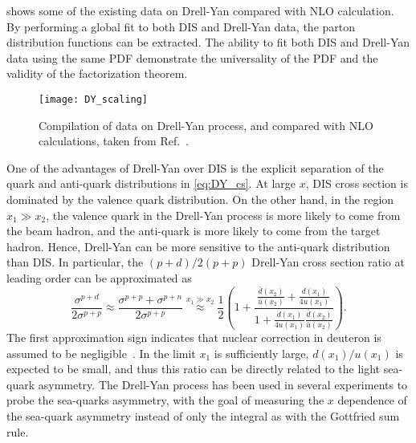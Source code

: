 \documentclass[../main.tex]{subfiles}
\begin{document}
 shows some of the existing data on Drell-Yan compared with NLO calculation. By
performing a global fit to both DIS and Drell-Yan data, the parton distribution
functions can be extracted. The ability to fit both DIS and Drell-Yan data using
the same PDF demonstrate the universality of the PDF and the validity of the
factorization theorem.
\begin{figure}[htbp!]
	\centering
	\texttt{[image: DY\_scaling]}
	\caption{Compilation of data on Drell-Yan process, and compared with NLO calculations,
		taken from Ref.~\cite{mcgaughey1999}.}
	\label{fig:DY_scaling}
\end{figure}

One of the advantages of Drell-Yan over DIS is the explicit separation of the quark
and anti-quark distributions in \cref{eq:DY_cs}. At large $x$, DIS cross section
is dominated by the valence quark distribution. On the other hand, in the region $x_1 \gg x_2$,
the valence quark in the Drell-Yan process is more likely to come from the beam
hadron, and the anti-quark is more likely to come from the target hadron. Hence,
Drell-Yan can be more sensitive to the anti-quark distribution than DIS. In
particular, the $(p+d)/2(p+p)$ Drell-Yan cross section ratio at leading order
can be approximated as
\begin{equation}
	\frac{\sigma^{p+d}}{2\sigma^{p+p}}\approx \frac{\sigma^{p+p}+\sigma^{p+n}}{2\sigma^{p+p}}
	\stackrel{x_1\gg x_2}{\approx} \frac{1}{2} \left( 1+ \frac{\frac{\bar{d}\left(x_2\right)}{\bar{u}\left(x_2\right)} + \frac{d\left(x_1\right)}{4u\left(x_1\right)} }{1+\frac{d\left(x_1\right)}{4u\left(x_1\right)} \frac{\bar{d}\left(x_2\right)}{\bar{u}\left(x_2\right)} }\right).
\end{equation}
The first approximation sign indicates that nuclear correction in deuteron is assumed to be negligible~\cite{ehlers2014}.
In the limit $x_1$ is sufficiently large, $d\left(x_1\right)/u\left(x_1\right)$ is expected
to be small, and thus this ratio can be directly related to the light sea-quark
asymmetry. The Drell-Yan process has been used in several experiments to probe the sea-quarks
asymmetry, with the goal of measuring the $x$ dependence of the sea-quark asymmetry
instead of only the integral as with the Gottfried sum rule.
\end{document}

